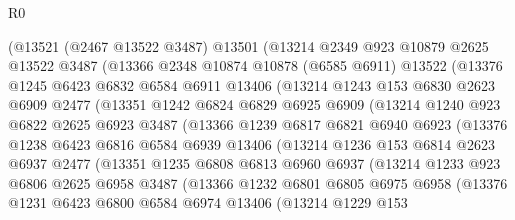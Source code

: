 \begin{lexlean}{R0}
\begin{coremodule}
      (@13521
        (@2467 @13522 @3487)
        @13501
        (@13214
          @2349
          @923
          @10879
          @2625
          @13522
          @3487
          (@13366
            @2348
            @10874
            @10878
            (@6585 @6911)
            @13522
            (@13376
              @1245
              @6423
              @6832
              @6584
              @6911
              @13406
              (@13214
                @1243
                @153
                @6830
                @2623
                @6909
                @2477
                (@13351
                  @1242
                  @6824
                  @6829
                  @6925
                  @6909
                  (@13214
                    @1240
                    @923
                    @6822
                    @2625
                    @6923
                    @3487
                    (@13366
                      @1239
                      @6817
                      @6821
                      @6940
                      @6923
                      (@13376
                        @1238
                        @6423
                        @6816
                        @6584
                        @6939
                        @13406
                        (@13214
                          @1236
                          @153
                          @6814
                          @2623
                          @6937
                          @2477
                          (@13351
                            @1235
                            @6808
                            @6813
                            @6960
                            @6937
                            (@13214
                              @1233
                              @923
                              @6806
                              @2625
                              @6958
                              @3487
                              (@13366
                                @1232
                                @6801
                                @6805
                                @6975
                                @6958
                                (@13376
                                  @1231
                                  @6423
                                  @6800
                                  @6584
                                  @6974
                                  @13406
                                  (@13214
                                    @1229
                                    @153

\end{coremodule}
\end{lexlean}
